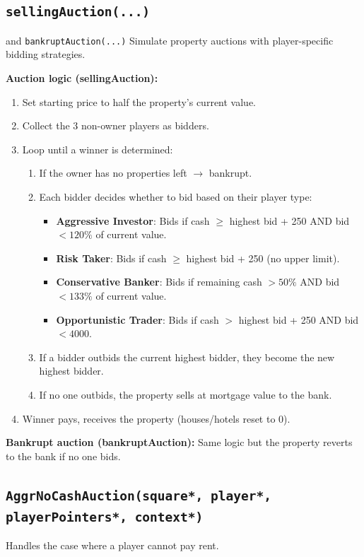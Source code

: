 \documentclass[12pt,a4paper]{article}
\begin{document}
\subsection{\texttt{sellingAuction(...)}} and \texttt{bankruptAuction(...)}
Simulate property auctions with player-specific bidding strategies.

\textbf{Auction logic (sellingAuction):}
\begin{enumerate}[noitemsep]
    \item Set starting price to half the property's current value.
    \item Collect the 3 non-owner players as bidders.
    \item Loop until a winner is determined:
    \begin{enumerate}[noitemsep]
        \item If the owner has no properties left $\rightarrow$ bankrupt.
        \item Each bidder decides whether to bid based on their player type:
        \begin{itemize}[noitemsep]
            \item \textbf{Aggressive Investor}: Bids if cash $\geq$ highest bid + 250 AND bid $< 120\%$ of current value.
            \item \textbf{Risk Taker}: Bids if cash $\geq$ highest bid + 250 (no upper limit).
            \item \textbf{Conservative Banker}: Bids if remaining cash $> 50\%$ AND bid $< 133\%$ of current value.
            \item \textbf{Opportunistic Trader}: Bids if cash $>$ highest bid + 250 AND bid $< 4000$.
        \end{itemize}
        \item If a bidder outbids the current highest bidder, they become the new highest bidder.
        \item If no one outbids, the property sells at mortgage value to the bank.
    \end{enumerate}
    \item Winner pays, receives the property (houses/hotels reset to 0).
\end{enumerate}

\textbf{Bankrupt auction (bankruptAuction):} Same logic but the property reverts to the bank if no one bids.

\subsection{\texttt{AggrNoCashAuction(square*, player*, playerPointers*, context*)}}
Handles the case where a player cannot pay rent.
\end{document}
